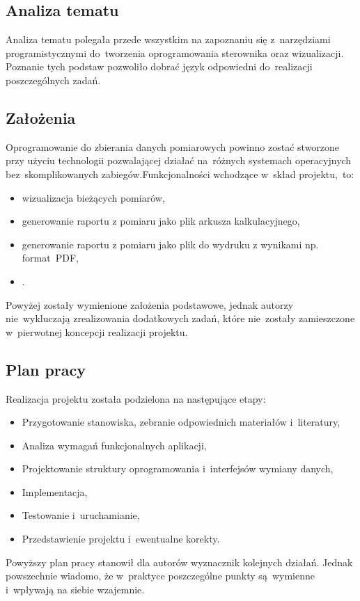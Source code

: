 \subsection{Analiza tematu}
Analiza tematu polegała przede wszystkim na zapoznaniu się z~narzędziami programistycznymi do~tworzenia oprogramowania sterownika oraz wizualizacji.
Poznanie tych podstaw pozwoliło dobrać język odpowiedni do~realizacji poszczególnych zadań.

\subsection{Założenia}
Oprogramowanie do zbierania danych pomiarowych powinno zostać stworzone przy użyciu technologii pozwalającej działać na~różnych systemach operacyjnych bez~skomplikowanych zabiegów.Funkcjonalności wchodzące w~skład projektu,~to:
\begin{itemize}
\item wizualizacja bieżących pomiarów,
\item generowanie raportu z pomiaru jako plik arkusza kalkulacyjnego,
\item generowanie raportu z pomiaru jako plik do wydruku z wynikami np. format~PDF,
\item .
\end{itemize}
\indent
\indent Powyżej zostały wymienione założenia podstawowe, jednak autorzy nie~wykluczają zrealizowania dodatkowych zadań, które nie~zostały zamieszczone w~pierwotnej koncepcji realizacji projektu.

\subsection{Plan pracy}
Realizacja projektu została podzielona na następujące etapy:
\begin{itemize}
\item Przygotowanie stanowiska, zebranie odpowiednich materiałów i~literatury,
\item Analiza wymagań funkcjonalnych aplikacji,
\item Projektowanie struktury oprogramowania i~interfejsów wymiany danych,
\item Implementacja,
\item Testowanie i~uruchamianie,
\item Przedstawienie projektu i~ewentualne korekty.
\end{itemize}
\indent
\indent Powyższy plan pracy stanowił dla autorów wyznacznik kolejnych działań. Jednak powszechnie wiadomo, że w~praktyce poszczególne punkty są~wymienne i~wpływają na siebie wzajemnie.

